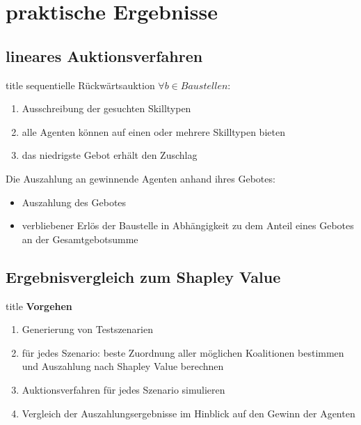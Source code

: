 \documentclass[c]{beamer}
\theoremstyle{break}
\begin{document}
  \section*{praktische Ergebnisse}
  \subsection*{lineares Auktionsverfahren}
  \begin{frame}{title}
    sequentielle Rückwärtsauktion $\forall{b \in Baustellen}$:
    \begin{enumerate}
      \item Ausschreibung der gesuchten Skilltypen
      \item alle Agenten können auf einen oder mehrere Skilltypen bieten
      \item das niedrigste Gebot erhält den Zuschlag \\[2em]
    \end{enumerate}

    Die Auszahlung an gewinnende Agenten anhand ihres Gebotes:
    \begin{itemize}
      \item Auszahlung des Gebotes
      \item verbliebener Erlös der Baustelle in Abhängigkeit zu dem Anteil eines Gebotes an der Gesamtgebotsumme
    \end{itemize}
  \end{frame}

  \subsection*{Ergebnisvergleich zum Shapley Value}
  \begin{frame}{title}
    \textbf{Vorgehen}
    \begin{enumerate}
      \item Generierung von Testszenarien
      \item für jedes Szenario: beste Zuordnung aller möglichen Koalitionen bestimmen und Auszahlung nach Shapley Value berechnen
      \item Auktionsverfahren für jedes Szenario simulieren
      \item Vergleich der Auszahlungsergebnisse im Hinblick auf den Gewinn der Agenten
    \end{enumerate}
  \end{frame}
  
\end{document}
